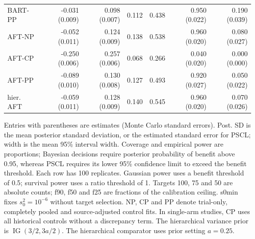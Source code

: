 \begin{landscape}
\begin{longtable}{lrrrrrr}
BART-PP & -0.031 (0.009) & 0.098 (0.007) & 0.112 & 0.438 & 0.950 (0.022) & 0.190 (0.039) \\
AFT-NP & -0.052 (0.011) & 0.124 (0.009) & 0.138 & 0.538 & 0.960 (0.020) & 0.080 (0.027) \\
AFT-CP & -0.250 (0.006) & 0.257 (0.006) & 0.068 & 0.266 & 0.040 (0.020) & 0.000 (0.000) \\
AFT-PP & -0.089 (0.010) & 0.130 (0.008) & 0.127 & 0.493 & 0.920 (0.027) & 0.050 (0.022) \\
hier. AFT & -0.059 (0.011) & 0.128 (0.009) & 0.140 & 0.545 & 0.960 (0.020) & 0.070 (0.026) \\
\end{longtable}
\noindent\begin{minipage}{\linewidth}\footnotesize Entries with parentheses are estimates (Monte Carlo standard errors). Post. SD is the mean posterior standard deviation, or the estimated standard error for PSCL; width is the mean 95\% interval width. Coverage and empirical power are proportions; Bayesian decisions require posterior probability of benefit above 0.95, whereas PSCL requires its lower 95\% confidence limit to exceed the benefit threshold. Each row has 100 replicates. Gaussian power uses a benefit threshold of 0.5; survival power uses a ratio threshold of 1. Targets 100, 75 and 50 are absolute counts; f90, f50 and f25 are fractions of the calibration ceiling. s0min fixes $s_0^2=10^{-6}$ without target selection. NP, CP and PP denote trial-only, completely pooled and source-adjusted control fits. In single-arm studies, CP uses all historical controls without a discrepancy term. The hierarchical variance prior is $\operatorname{IG}(3/2,3a/2)$. The hierarchical comparator uses prior setting $a=0.25$.\end{minipage}
\endgroup
\end{landscape}

